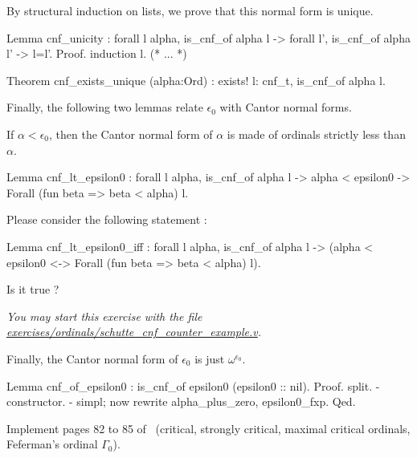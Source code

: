 {By structural induction on lists, we prove that this normal form is unique.

\begin{Coqsrc}
 Lemma cnf_unicity : forall l alpha, 
   is_cnf_of alpha l -> 
   forall l',  is_cnf_of alpha l' -> l=l'.
Proof.
 induction l.
 (*  ...  *)

Theorem cnf_exists_unique (alpha:Ord) :
  exists! l: cnf_t, is_cnf_of alpha l.
\end{Coqsrc}


Finally, the following two lemmas relate  $\epsilon_0$ with Cantor normal forms.

If $\alpha<\epsilon_0$, then the Cantor normal form of $\alpha$ is made of ordinals strictly less than $\alpha$.

\begin{Coqsrc}
Lemma cnf_lt_epsilon0 : 
 forall l alpha, 
   is_cnf_of alpha l ->  alpha < epsilon0 ->
   Forall (fun beta =>  beta < alpha) l.
\end{Coqsrc}


\begin{exercise}
Please consider the following statement :

\begin{Coqsrc}
Lemma cnf_lt_epsilon0_iff : 
 forall l alpha, 
   is_cnf_of alpha l ->  
   (alpha < epsilon0 <->  Forall (fun beta =>  beta < alpha) l).
\end{Coqsrc}

Is it true ?

\emph{You may start this exercise with the file
    \href{https://github.com/coq-community/hydra-battles/tree/master/exercises/ordinals/schutte_cnf_counter_example.v}{exercises/ordinals/schutte\_cnf\_counter\_example.v}.}
\end{exercise}

Finally, the Cantor normal form of $\epsilon_0$ is just $\omega^{\epsilon_0}$.

\begin{Coqsrc}
Lemma cnf_of_epsilon0 : is_cnf_of epsilon0 (epsilon0 :: nil).
Proof.
  split.
  - constructor.  
  - simpl;  now rewrite alpha_plus_zero, epsilon0_fxp.
Qed.
\end{Coqsrc}


\begin{project}
Implement pages 82 to 85 of~\cite{schutte} (critical, strongly critical, maximal critical ordinals, Feferman's ordinal $\Gamma_0$).
\end{project}

}
